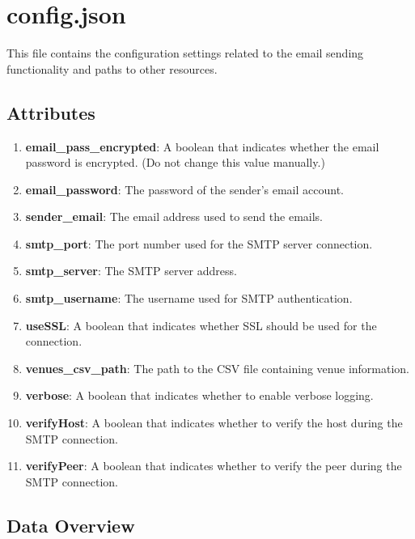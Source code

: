 \documentclass{article}
\begin{document}
	\section{config.json}
	
	This file contains the configuration settings related to the email sending functionality and paths to other resources.
	
	\subsection*{Attributes}
	\begin{enumerate}
		\item \textbf{email\_pass\_encrypted}: A boolean that indicates whether the email password is encrypted. (Do not change this value manually.)
		\item \textbf{email\_password}: The password of the sender's email account.
		\item \textbf{sender\_email}: The email address used to send the emails.
		\item \textbf{smtp\_port}: The port number used for the SMTP server connection.
		\item \textbf{smtp\_server}: The SMTP server address.
		\item \textbf{smtp\_username}: The username used for SMTP authentication.
		\item \textbf{useSSL}: A boolean that indicates whether SSL should be used for the connection.
		\item \textbf{venues\_csv\_path}: The path to the CSV file containing venue information.
		\item \textbf{verbose}: A boolean that indicates whether to enable verbose logging.
		\item \textbf{verifyHost}: A boolean that indicates whether to verify the host during the SMTP connection.
		\item \textbf{verifyPeer}: A boolean that indicates whether to verify the peer during the SMTP connection.
	\end{enumerate}
	
	\subsection*{Data Overview}
	
\end{document}
